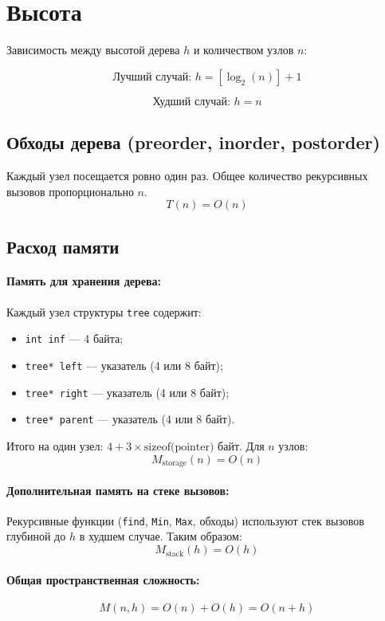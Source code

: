 \documentclass[otchet]{SCWorks}
\begin{document}
\section{Высота}

Зависимость между высотой дерева $h$ и количеством узлов $n$:


$$ \text{Лучший случай: } h = [\log_2(n)] + 1$$

$$ \text{Худший случай: } h = n$$

\subsection{Обходы дерева (preorder, inorder, postorder)}
Каждый узел посещается ровно один раз. Общее количество рекурсивных вызовов пропорционально \(n\).
\[
T(n) = O(n)
\]

\subsection{Расход памяти}

\paragraph{Память для хранения дерева:}
Каждый узел структуры \texttt{tree} содержит:
\begin{itemize}
    \item \texttt{int inf} — 4 байта;
    \item \texttt{tree* left} — указатель (4 или 8 байт);
    \item \texttt{tree* right} — указатель (4 или 8 байт);
    \item \texttt{tree* parent} — указатель (4 или 8 байт).
\end{itemize}
Итого на один узел: \(4 + 3 \times \text{sizeof(pointer)}\) байт. Для \(n\) узлов:
\[
M_{\text{storage}}(n) = O(n)
\]

\paragraph{Дополнительная память на стеке вызовов:}
Рекурсивные функции (\texttt{find}, \texttt{Min}, \texttt{Max}, обходы) используют стек вызовов глубиной до \(h\) в худшем случае. Таким образом:
\[
M_{\text{stack}}(h) = O(h)
\]

\paragraph{Общая пространственная сложность:}
\[
M(n, h) = O(n) + O(h) = O(n + h)
\]
\end{document}
